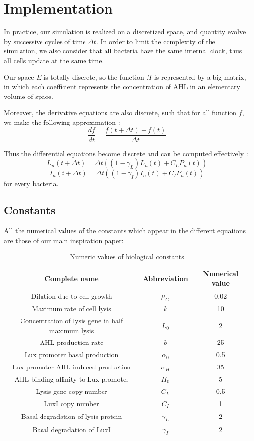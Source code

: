 \documentclass[a4paper]{article}
\theoremstyle{definition}
\begin{document}
\section{Implementation}

In practice, our simulation is realized on a discretized space, and quantity evolve by successive cycles of time $\Delta t$. In order to limit the complexity of the simulation, we also consider that all bacteria have the same internal clock, thus all cells update at the same time.

Our space $E$ is totally discrete, so the function $H$ is represented by a big matrix, in which each coefficient represents the concentration of AHL in an elementary volume of space.

Moreover, the derivative equations are also discrete, such that for all function $f$, we make the following approximation :
$$\frac{df}{dt} = \frac{f(t+\Delta t) - f(t)}{\Delta t}$$

Thus the differential equations become discrete and can be computed effectively :
\begin{equation}
L_n(t+\Delta t) = \Delta t((1-\gamma_L)L_n(t) + C_L P_n(t))
\end{equation}
\begin{equation}
I_n(t+\Delta t) = \Delta t((1-\gamma_I)I_n(t) + C_I P_n(t))
\end{equation}
for every bacteria.

\subsection*{Constants}

All the numerical values of the constants which appear in the different equations are those of our main inspiration paper:

\begin{table}[h!]
\centering
\begin{tabular}{c|c|c}
Complete name & Abbreviation & Numerical value \\
\hline
Dilution due to cell growth & $\mu_G$ & 0.02 \\
Maximum rate of cell lysis & $k$ & 10 \\
Concentration of lysis gene in half maximum lysis & $L_0$ & 2 \\
AHL production rate & $b$ & 25 \\
Lux promoter basal production & $\alpha_0$ & 0.5 \\
Lux promoter AHL induced production & $\alpha_H$ & 35 \\
AHL binding affinity to Lux promoter & $H_0$ & 5 \\
Lysis gene copy number & $C_L$ & 0.5 \\
LuxI copy number & $C_I$ & 1 \\
Basal degradation of lysis protein & $\gamma_L$ & 2 \\
Basal degradation of LuxI & $\gamma_I$ & 2 \\
\end{tabular}
\caption{Numeric values of biological constants}
\end{table}
\end{document}
